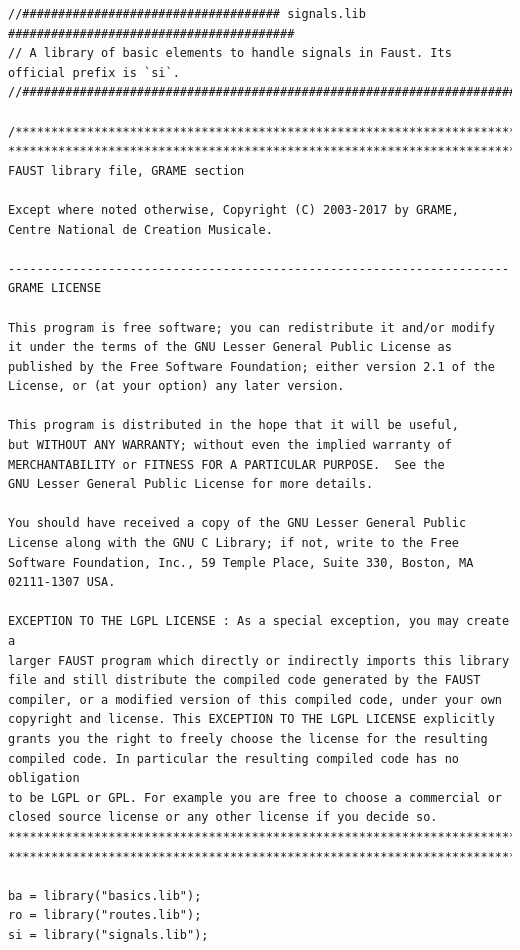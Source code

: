 \documentclass{article}
\begin{document}
\bigskip\bigskip
\begin{lstlisting}[caption=\texttt{signals.lib}]
//#################################### signals.lib ########################################
// A library of basic elements to handle signals in Faust. Its official prefix is `si`.
//########################################################################################

/************************************************************************
************************************************************************
FAUST library file, GRAME section

Except where noted otherwise, Copyright (C) 2003-2017 by GRAME,
Centre National de Creation Musicale.

----------------------------------------------------------------------
GRAME LICENSE

This program is free software; you can redistribute it and/or modify
it under the terms of the GNU Lesser General Public License as
published by the Free Software Foundation; either version 2.1 of the
License, or (at your option) any later version.

This program is distributed in the hope that it will be useful,
but WITHOUT ANY WARRANTY; without even the implied warranty of
MERCHANTABILITY or FITNESS FOR A PARTICULAR PURPOSE.  See the
GNU Lesser General Public License for more details.

You should have received a copy of the GNU Lesser General Public
License along with the GNU C Library; if not, write to the Free
Software Foundation, Inc., 59 Temple Place, Suite 330, Boston, MA
02111-1307 USA.

EXCEPTION TO THE LGPL LICENSE : As a special exception, you may create a
larger FAUST program which directly or indirectly imports this library
file and still distribute the compiled code generated by the FAUST
compiler, or a modified version of this compiled code, under your own
copyright and license. This EXCEPTION TO THE LGPL LICENSE explicitly
grants you the right to freely choose the license for the resulting
compiled code. In particular the resulting compiled code has no obligation
to be LGPL or GPL. For example you are free to choose a commercial or
closed source license or any other license if you decide so.
************************************************************************
************************************************************************/

ba = library("basics.lib");
ro = library("routes.lib");
si = library("signals.lib");


\end{lstlisting}
\end{document}
